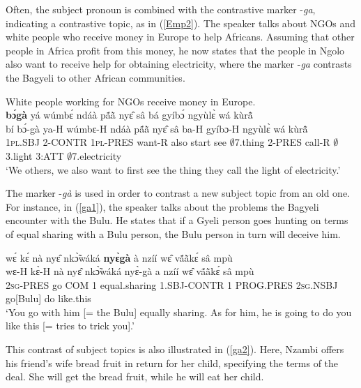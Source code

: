 Often, the subject pronoun is combined with the contrastive marker -{\itshape ga}, indicating a contrastive topic, as in (\ref{Emp2}). The speaker talks about NGOs and white people who receive money in Europe to help Africans. Assuming that other people in Africa profit from this money, he now states that the people in Ngolo also want to receive help for obtaining electricity, where the marker -{\itshape ga} contrasts the Bagyeli to other African communities.

\begin{exe} 
\ex\label{Emp2} White people working for NGOs receive money in Europe.\\
   {\bfseries bɔ́gà} yá wúmbɛ́ ndáà pã́ã̀ nyɛ̂ sâ bá gyíbɔ́ ngyùlɛ̀ wá kùrã̂\\
         bí bɔ́-gà ya-H wúmbɛ-H ndáà pã́ã̀ nyɛ̂ sâ ba-H gyíbɔ-H ngyùlɛ̀ wá kùrã̂\\
          1\textsc{pl}.SBJ 2-CONTR 1\textsc{pl}-PRES want-R also start see $\emptyset$7.thing 2-PRES call-R $\emptyset$3.light 3:ATT $\emptyset$7.electricity\\
    \trans `We others, we also want to first see the thing they call the light of electricity.'
\end{exe}

The marker -{\itshape gà} is used in order to contrast a new subject topic from an old one. For instance, in (\ref{ga1}), the speaker talks about the problems the Bagyeli encounter with the Bulu. He states that if a Gyeli person goes hunting on terms of equal sharing with a Bulu person, the Bulu person in turn will deceive him.

\begin{exe} 
\ex\label{ga1} 
  \glll wɛ́ kɛ́ nà nyɛ̂ nkɔ̃̀wáká {\bfseries nyɛ̀gà} à nzíí wɛ̂ vã́ã̀kɛ́ sâ mpù \\
         wɛ-H kɛ̀-H nà nyɛ̂ nkɔ̃̀wáká nyɛ̀-gà a nzíí wɛ̂ vã́ã̀kɛ́ sâ mpù \\
         2\textsc{sg}-PRES go COM 1 equal.sharing 1.SBJ-CONTR 1 PROG.PRES 2\textsc{sg}.NSBJ go[Bulu] do like.this  \\
    \trans `You go with him [= the Bulu] equally sharing. As for him, he is going to do you like this [= tries to trick you].'
\end{exe}

This contrast of subject topics is also illustrated in (\ref{ga2}). Here, Nzambi offers his friend's wife bread fruit in return for her child, specifying the terms of the deal. She will get the bread fruit, while he will eat her child.

